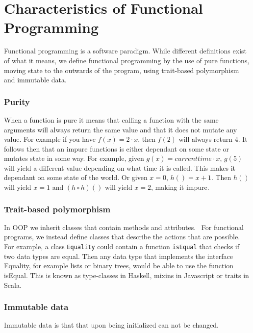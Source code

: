 \documentclass[12pt]{report}
\theoremstyle{definition}
\theoremstyle{theorem}
\begin{document}
\section{Characteristics of Functional Programming}\label{functionalprogramming}

Functional programming is a software paradigm. While different definitions exist
of what it means, we define functional programming by the use of pure functions,
moving state to the outwards of the program, using trait-based polymorphism and
immutable data.

\subsubsection*{Purity}

When a function is pure it means that calling a function with the same arguments
will always return the same value and that it does not mutate any value. For
example if you have $f(x) = 2\cdot x$, then $f(2)$ will always return $4$. It
follows then that an impure functions is either dependant on some state or
mutates state in some way. For example, given $g(x) = currenttime \cdot x$,
$g(5)$ will yield a different value depending on what time it is called. This
makes it dependant on some state of the world. Or given $x=0$, $h()=x+1$. Then
$h()$ will yield $x=1$ and $(h \circ h)()$ will yield $x=2$, making it
impure.~\cite{wikipedia_pure}

\subsubsection*{Trait-based polymorphism}

In OOP we inherit classes that contain methods and
attributes.~\cite{Gamma:1995:DPE:186897} For functional programs, we instead
define classes that describe the actions that are possible. For example, a class
\texttt{Equality} could contain a function \texttt{isEqual} that checks if two
data types are equal. Then any data type that implements the interface Equality,
for example lists or binary trees, would be able to use the function isEqual.
This is known as type-classes in Haskell, mixins in Javascript or traits in
Scala.

\subsubsection*{Immutable data}

Immutable data is that that upon being initialized can not be changed. 
\end{document}

